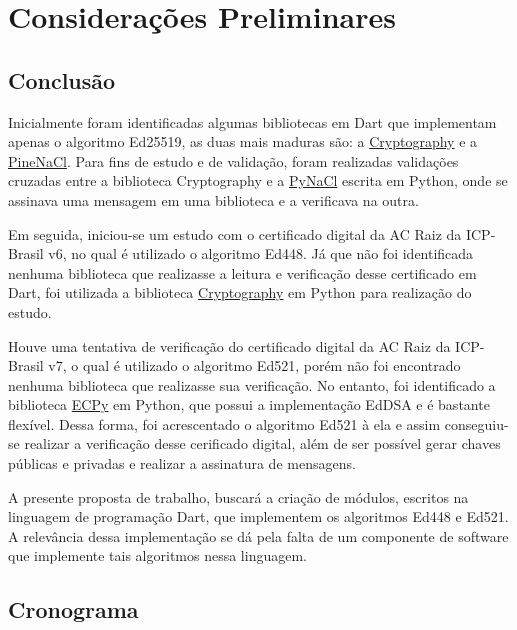 \chapter[Considerações Preliminares]{Considerações Preliminares}

\section{Conclusão}

Inicialmente foram identificadas algumas bibliotecas em Dart que implementam apenas o algoritmo Ed25519, as duas mais maduras são: a \href{https://pub.dev/packages/cryptography}{Cryptography} e a \href{https://pub.dev/packages/pinenacl}{PineNaCl}. Para fins de estudo e de validação, foram realizadas validações cruzadas entre a biblioteca Cryptography e a \href{https://pynacl.readthedocs.io/en/1.4.0/signing/}{PyNaCl} escrita em Python, onde se assinava uma mensagem em uma biblioteca e a verificava na outra.

Em seguida, iniciou-se um estudo com o certificado digital da AC Raiz da ICP-Brasil v6, no qual é utilizado o algoritmo Ed448. Já que não foi identificada nenhuma biblioteca que realizasse a leitura e verificação desse certificado em Dart,  foi utilizada a biblioteca \href{https://cryptography.io/en/latest/x509/reference/}{Cryptography} em Python para realização do estudo.

Houve uma tentativa de verificação do certificado digital da AC Raiz da ICP-Brasil v7, o qual é utilizado o algoritmo Ed521, porém não foi encontrado nenhuma biblioteca que realizasse sua verificação. No entanto, foi identificado a biblioteca \href{https://github.com/cslashm/ECPy}{ECPy} em Python, que possui a implementação EdDSA e é bastante flexível. Dessa forma, foi acrescentado o algoritmo Ed521 à ela e assim conseguiu-se realizar a verificação desse cerificado digital, além de ser possível gerar chaves públicas e privadas e realizar a assinatura de mensagens. 

A presente proposta de trabalho, buscará a criação de módulos, escritos na linguagem de programação Dart, que implementem os algoritmos Ed448 e Ed521. A relevância dessa implementação se dá pela falta de um componente de software que implemente tais algoritmos nessa linguagem.

\section{Cronograma}

